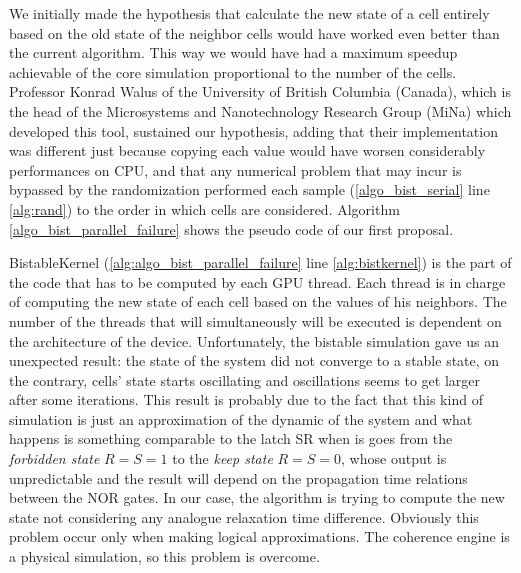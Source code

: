 We initially made the hypothesis that calculate the new state of a cell entirely based on the old state of the neighbor cells would have worked even better than the current algorithm. This way we would have had a maximum speedup achievable of the core simulation proportional to the number of the cells.
Professor Konrad Walus of the University of British Columbia (Canada), which is the head of the Microsystems and Nanotechnology Research Group (MiNa) which developed this tool, sustained our hypothesis, adding that their implementation was different just because copying each value would have worsen considerably performances on CPU, and that any numerical problem that may incur is bypassed by the randomization performed each sample (\ref{algo_bist_serial} line \ref{alg:rand}) to the order in which cells are considered. Algorithm \ref{algo_bist_parallel_failure} shows the pseudo code of our first proposal.

BistableKernel (\ref{alg:algo_bist_parallel_failure} line \ref{alg:bistkernel}) is the part of the code that has to be computed by each GPU thread. Each thread is in charge of computing the new state of each cell based on the values of his neighbors. The number of the threads that will simultaneously will be executed is dependent on the architecture of the device.
Unfortunately, the bistable simulation gave us an unexpected result: the state of the system did not converge to a stable state, on the contrary, cells' state starts oscillating and oscillations seems to get larger after some iterations. This result is probably due to the fact that this kind of simulation is just an approximation of the dynamic of the system and what happens is something comparable to the latch SR when is goes from the \textit{forbidden state} $R=S=1$ to the \textit{keep state} $R=S=0$, whose output is unpredictable and the result will depend on the propagation time relations between the NOR gates. In our case, the algorithm is trying to compute the new state not considering any analogue relaxation time difference. Obviously this problem occur only when making logical approximations. The coherence engine is a physical simulation, so this problem is overcome.

